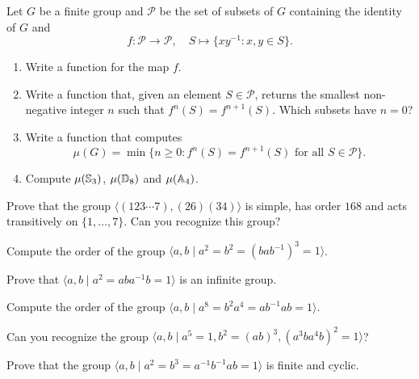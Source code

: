 \begin{prob}
    Let $G$ be a finite group and 
    $\mathcal{P}$ be the set of subsets of $G$ 
    containing the identity of $G$ and 
    \[
    f\colon\mathcal{P}\to\mathcal{P},
    \quad S\mapsto \{xy^{-1}:x,y\in S\}.
    \]
    \begin{enumerate}
        \item Write a function for the map $f$.
        \item Write a function that, given an element $S\in \mathcal{P}$, returns the smallest non-negative integer $n$
            such that $f^n(S)=f^{n+1}(S)$.
            Which subsets have $n = 0$?
        \item Write a function that computes
        \[
        \mu(G)=\min\{n\geq 0:f^n(S)=f^{n+1}(S)\text{ for all $S\in\mathcal{P}$}\}.
        \]
        \item Compute $\mu(\mathbb{S}_3)$, $\mu(\mathbb{D}_8)$ and $\mu(\mathbb{A}_4)$.
    \end{enumerate}
\end{prob}



\begin{prob}
Prove that the group $\langle (123\cdots7),(26)(34)\rangle$ is simple, 
has order $168$ and acts transitively on $\{1,\dots,7\}$.
Can you recognize this group?
\end{prob}

\begin{prob}
  Compute the order of the group $\langle a,b\mid a^2=b^2=(bab^{-1})^3=1\rangle$. 
\end{prob}

\begin{prob}
  Prove that $\langle a,b\mid a^2=aba^{-1}b=1\rangle$ is an infinite group.
\end{prob}

\begin{prob}
	\label{prob:order16}
  Compute the order of the group
  $\langle a,b\mid  a^8=b^2a^4=ab^{-1}ab=1\rangle$.
\end{prob}

\begin{prob}
\label{prob:recognizeA5}
Can you recognize the group $\langle a,b\mid a^5=1, b^2=(ab)^3, (a^3ba^4b)^2=1\rangle$?
\end{prob}
%
\begin{prob}
Prove that the group $\langle a,b\mid a^2=b^3=a^{-1}b^{-1}ab=1\rangle$ is finite and cyclic.
\end{prob}

